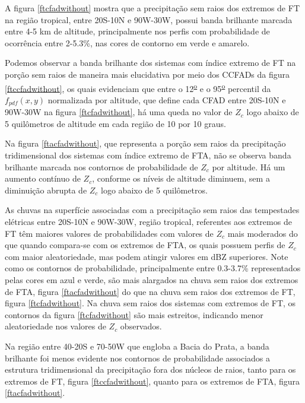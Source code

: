 A figura \ref{ftcfadwithout} mostra que a precipitação sem raios dos extremos de FT na região tropical, entre 20S-10N e 90W-30W, possui banda brilhante marcada entre 4-5 km de altitude, principalmente nos perfis com probabilidade de ocorrência entre 2-5.3\%, nas cores de contorno em verde e amarelo. 

Podemos observar a banda brilhante dos sistemas com índice extremo de FT na porção sem raios de maneira mais elucidativa por meio dos CCFADs da figura \ref{ftccfadwithout}, os quais evidenciam que entre o 12\textsuperscript{\underline{o}} e o 95\textsuperscript{\underline{o}} percentil da $f_{pdf}(x,y)$ normalizada por altitude, que define cada CFAD entre 20S-10N e 90W-30W na figura \ref{ftcfadwithout}, há uma queda no valor de $Z_c$ logo abaixo de 5 quilômetros de altitude em cada região de 10 por 10 graus. 


Na figura \ref{ftacfadwithout}, que representa a porção sem raios da precipitação tridimensional dos sistemas com índice extremo de FTA, não se observa banda brilhante marcada nos contornos de probabilidade de $Z_c$ por altitude. Há um aumento contínuo de $Z_c$,  conforme os níveis de altitude diminuem, sem a diminuição abrupta de $Z_c$ logo abaixo de 5 quilômetros.   


As chuvas na superfície associadas com a precipitação sem raios das tempestades elétricas entre 20S-10N e 90W-30W, região tropical, referentes aos extremos de FT têm maiores valores de probabilidades com valores de $Z_c$ mais moderados do que quando compara-se com os extremos de FTA, os quais possuem perfis de $Z_c$ com maior aleatoriedade, mas podem atingir valores em dBZ superiores. Note como os contornos de probabilidade, principalmente entre 0.3-3.7\% representados pelas cores em azul e verde, são mais alargados na chuva sem raios dos extremos de FTA, figura \ref{ftacfadwithout} do que na chuva sem raios dos extremos de FT, figura \ref{ftcfadwithout}. Na chuva sem raios dos sistemas com extremos de FT, os contornos da figura \ref{ftcfadwithout} são mais estreitos, indicando menor aleatoriedade nos valores de $Z_c$ observados.

Na região entre 40-20S e 70-50W que engloba a Bacia do Prata, a banda brilhante foi menos evidente nos contornos de probabilidade associados a estrutura tridimensional da precipitação fora dos núcleos de raios, tanto para os extremos de FT, figura \ref{ftccfadwithout}, quanto para os extremos de FTA, figura \ref{ftacfadwithout}. 

